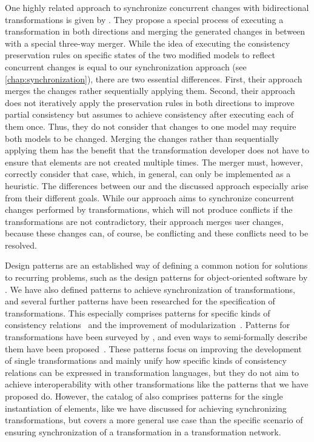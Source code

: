 One highly related approach to synchronize concurrent changes with bidirectional transformations is given by \textcite{xiong2009parallelUpdates-ICMT,xiong2013SynchronizingConcurrentUpdates-SoSym}.
They propose a special process of executing a transformation in both directions and merging the generated changes in between with a special three-way merger.
While the idea of executing the consistency preservation rules on specific states of the two modified models to reflect concurrent changes is equal to our synchronization approach (see \autoref{chap:synchronization}), there are two essential differences.
First, their approach merges the changes rather sequentially applying them.
Second, their approach does not iteratively apply the preservation rules in both directions to improve partial consistency but assumes to achieve consistency after executing each of them once. Thus, they do not consider that changes to one model may require both models to be changed.
Merging the changes rather than sequentially applying them has the benefit that the transformation developer does not have to ensure that elements are not created multiple times. The merger must, however, correctly consider that case, which, in general, can only be implemented as a heuristic.
The differences between our and the discussed approach especially arise from their different goals. 
While our approach aims to synchronize concurrent changes performed by transformations, which will not produce conflicts if the transformations are not contradictory, their approach merges user changes, because these changes can, of course, be conflicting and these conflicts need to be resolved.

Design patterns are an established way of defining a common notion for solutions to recurring problems, such as the design patterns for object-oriented software by \textcite{gamma1995designPatterns-Book}.
We have also defined patterns to achieve synchronization of transformations, and several further patterns have been researched for the specification of transformations.
This especially comprises patterns for specific kinds of consistency relations~\cite{iacob2008a} and the improvement of modularization~\cite{lano2014a}.
Patterns for transformations have been surveyed by \textcite{lano2018a}, and even ways to semi-formally describe them have been proposed~\cite{ergin2016patternsTransformations-CLSS}.
These patterns focus on improving the development of single transformations and mainly unify how specific kinds of consistency relations can be expressed in transformation languages, but they do not aim to achieve interoperability with other transformations like the patterns that we have proposed do.
However, the catalog of \textcite{lano2014a} also comprises patterns for the single instantiation of elements, like we have discussed for achieving synchronizing transformations, but covers a more general use case than the specific scenario of ensuring synchronization of a transformation in a transformation network.


